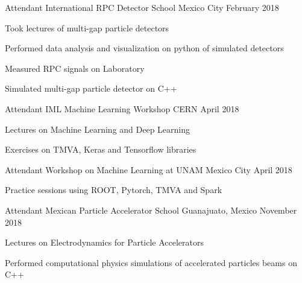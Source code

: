 
\begin{cventries}
  \cventry
    {Attendant} %
    {International RPC Detector School} %
    {Mexico City} %
    {February 2018} %
    {
      \begin{cvitems} %
        \item Took lectures of multi-gap particle detectors
		\item Performed data analysis and visualization on python of simulated detectors
		\item Measured RPC signals on Laboratory
		\item Simulated multi-gap particle detector on C++
      \end{cvitems}
    }

  \cventry
    {Attendant} %
    {IML Machine Learning Workshop} %
    {CERN} %
    {April 2018} %
    {
      \begin{cvitems} %
        \item Lectures on Machine Learning and Deep Learning
		\item Exercises on TMVA, Keras and Tensorflow libraries
      \end{cvitems}
    }
    
  \cventry
    {Attendant} %
    {Workshop on Machine Learning at UNAM} %
    {Mexico City} %
    {April 2018} %
    {
      \begin{cvitems} %
        \item Practice sessions using ROOT, Pytorch, TMVA and Spark
      \end{cvitems}
    }    

  \cventry
    {Attendant} %
    {Mexican Particle Accelerator School} %
    {Guanajuato, Mexico} %
    {November 2018} %
    {
      \begin{cvitems} %
        \item Lectures on Electrodynamics for Particle Accelerators
        \item Performed computational physics simulations of accelerated particles beams on C++
      \end{cvitems}
    }
\end{cventries}